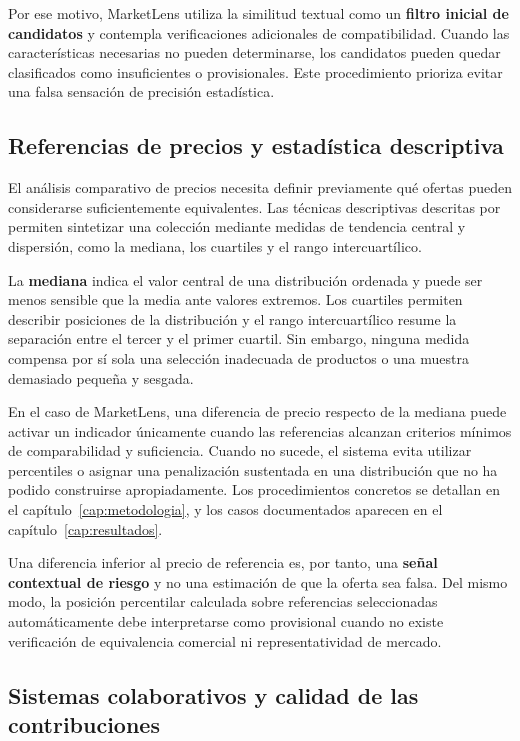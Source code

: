 Por ese motivo, MarketLens utiliza la similitud textual como un \textbf{filtro inicial de candidatos} y contempla verificaciones adicionales de compatibilidad. Cuando las características necesarias no pueden determinarse, los candidatos pueden quedar clasificados como insuficientes o provisionales. Este procedimiento prioriza evitar una falsa sensación de precisión estadística.

\subsection{Referencias de precios y estadística descriptiva}\label{subsec:ml-fundamento-precios}

El análisis comparativo de precios necesita definir previamente qué ofertas pueden considerarse suficientemente equivalentes. Las técnicas descriptivas descritas por \textcite{ml-han-2011} permiten sintetizar una colección mediante medidas de tendencia central y dispersión, como la mediana, los cuartiles y el rango intercuartílico.

La \textbf{mediana} indica el valor central de una distribución ordenada y puede ser menos sensible que la media ante valores extremos. Los cuartiles permiten describir posiciones de la distribución y el rango intercuartílico resume la separación entre el tercer y el primer cuartil. Sin embargo, ninguna medida compensa por sí sola una selección inadecuada de productos o una muestra demasiado pequeña y sesgada.

En el caso de MarketLens, una diferencia de precio respecto de la mediana puede activar un indicador únicamente cuando las referencias alcanzan criterios mínimos de comparabilidad y suficiencia. Cuando no sucede, el sistema evita utilizar percentiles o asignar una penalización sustentada en una distribución que no ha podido construirse apropiadamente. Los procedimientos concretos se detallan en el capítulo~\ref{cap:metodologia}, y los casos documentados aparecen en el capítulo~\ref{cap:resultados}.

Una diferencia inferior al precio de referencia es, por tanto, una \textbf{señal contextual de riesgo} y no una estimación de que la oferta sea falsa. Del mismo modo, la posición percentilar calculada sobre referencias seleccionadas automáticamente debe interpretarse como provisional cuando no existe verificación de equivalencia comercial ni representatividad de mercado.

\subsection{Sistemas colaborativos y calidad de las contribuciones}\label{subsec:ml-fundamento-colaborativo}

